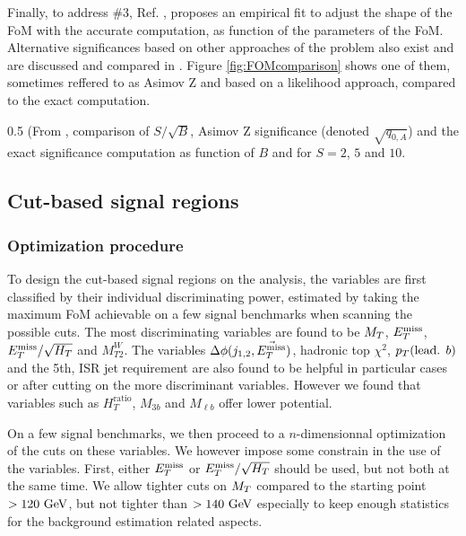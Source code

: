     Finally, to address \#3, Ref. \cite{Punzi}, proposes an empirical fit to adjust the
    shape of the FoM with the accurate computation, as function of the parameters
    of the FoM. Alternative significances based on other approaches of the problem also
    exist and are discussed and compared in .
    Figure \ref{fig:FOMcomparison} shows one of them, sometimes reffered to as Asimov Z and based on a
    likelihood approach, compared to the exact computation.

                 {0.5}
                 {(From , comparison of $S/\sqrt{B}$,
                 Asimov Z significance (denoted $\sqrt{q_{0,A}}$) and the exact significance computation
                 as function of $B$ and for $S = 2$, $5$ and $10$.}

        \subsection{Cut-based signal regions}

            \subsubsection{Optimization procedure}

    To design the cut-based signal regions on the analysis, the variables are first
    classified by their individual discriminating power, estimated by taking the
    maximum FoM achievable on a few signal benchmarks when scanning the possible
    cuts. The most discriminating variables are found to be $M_T$, $E_T^\text{miss}$,
    $E_T^\text{miss}/\sqrt{H_T}$ and $M_{T2}^{W}$. The variables $\Delta \phi(j_{1,2},\vec{E_T^\text{miss}})$,
    hadronic top $\chi^2$, $p_T(\text{lead. } b)$ and the 5th, ISR jet requirement are
    also found to be helpful in particular cases or after cutting on the more discriminant
    variables. However we found that variables such as $H_T^\text{ratio}$, $M_{3b}$ and
    $M_{\ell b}$ offer lower potential.

    On a few signal benchmarks, we then proceed to a $n$-dimensionnal optimization of the
    cuts on these variables. We however impose some constrain in the use of the variables.
    First, either $E_T^\text{miss}$ or $E_T^\text{miss}/\sqrt{H_T}$ should be used, but not both at the same time.
    We allow tighter cuts on $M_T$ compared to the starting point $> 120~\text{GeV}$, but not
    tighter than $> 140~\text{GeV}$ especially to keep enough statistics for the background
    estimation related aspects.

